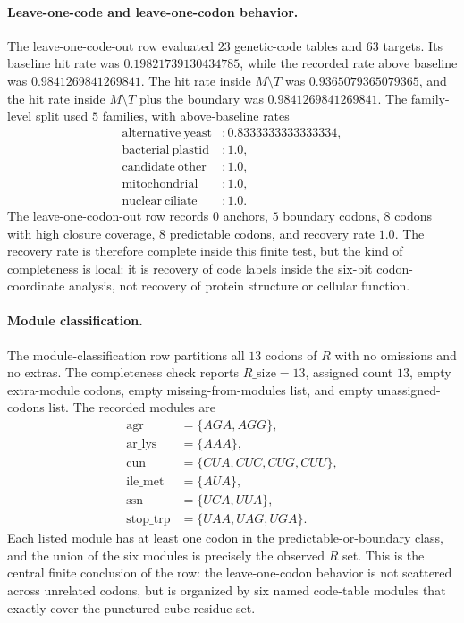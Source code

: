 \paragraph{Leave-one-code and leave-one-codon behavior.}
The leave-one-code-out row evaluated $23$ genetic-code tables and $63$ targets.  Its baseline hit rate was $0.19821739130434785$, while the recorded rate above baseline was $0.9841269841269841$.  The hit rate inside $M\setminus T$ was $0.9365079365079365$, and the hit rate inside $M\setminus T$ plus the boundary was $0.9841269841269841$.  The family-level split used $5$ families, with above-baseline rates
$$
\begin{aligned}
\mathrm{alternative\ yeast}&:0.8333333333333334,\\
\mathrm{bacterial\ plastid}&:1.0,\\
\mathrm{candidate\ other}&:1.0,\\
\mathrm{mitochondrial}&:1.0,\\
\mathrm{nuclear\ ciliate}&:1.0.
\end{aligned}
$$
The leave-one-codon-out row records $0$ anchors, $5$ boundary codons, $8$ codons with high closure coverage, $8$ predictable codons, and recovery rate $1.0$.  The recovery rate is therefore complete inside this finite test, but the kind of completeness is local: it is recovery of code labels inside the six-bit codon-coordinate analysis, not recovery of protein structure or cellular function.

\paragraph{Module classification.}
The module-classification row partitions all $13$ codons of $R$ with no omissions and no extras.  The completeness check reports $R\_\mathrm{size}=13$, assigned count $13$, empty extra-module codons, empty missing-from-modules list, and empty unassigned-codons list.  The recorded modules are
$$
\begin{aligned}
\mathrm{agr}&=\{AGA,AGG\},\\
\mathrm{ar\_lys}&=\{AAA\},\\
\mathrm{cun}&=\{CUA,CUC,CUG,CUU\},\\
\mathrm{ile\_met}&=\{AUA\},\\
\mathrm{ssn}&=\{UCA,UUA\},\\
\mathrm{stop\_trp}&=\{UAA,UAG,UGA\}.
\end{aligned}
$$
Each listed module has at least one codon in the predictable-or-boundary class, and the union of the six modules is precisely the observed $R$ set.  This is the central finite conclusion of the row: the leave-one-codon behavior is not scattered across unrelated codons, but is organized by six named code-table modules that exactly cover the punctured-cube residue set.

